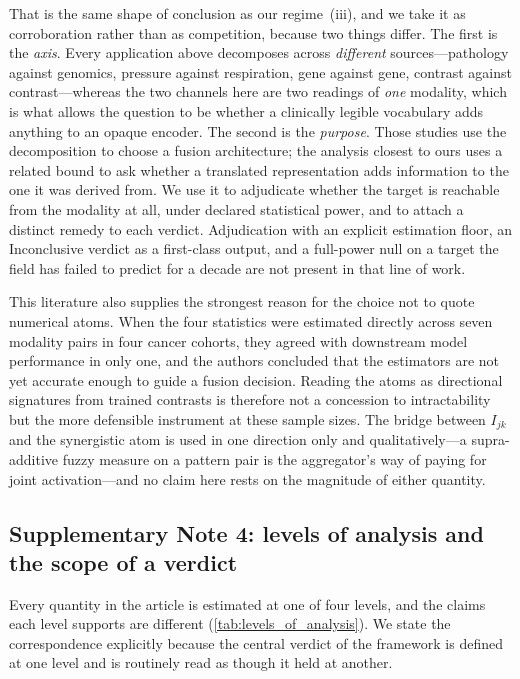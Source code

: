 That is the same shape of conclusion as our regime~(iii), and we take it
as corroboration rather than as competition, because two things differ.
The first is the \emph{axis}. Every application above decomposes across
\emph{different} sources---pathology against genomics, pressure against
respiration, gene against gene, contrast against contrast---whereas the
two channels here are two readings of \emph{one} modality, which is what
allows the question to be whether a clinically legible vocabulary adds
anything to an opaque encoder. The second is the \emph{purpose}. Those
studies use the decomposition to choose a fusion architecture; the
analysis closest to ours uses a related bound to ask whether a translated
representation adds information to the one it was derived
from.\cite{saisan2026ceilings} We use it to adjudicate whether the target
is reachable from the modality at all, under declared statistical power,
and to attach a distinct remedy to each verdict. Adjudication with an
explicit estimation floor, an Inconclusive verdict as a first-class
output, and a full-power null on a target the field has failed to
predict for a decade are not present in that line of work.

This literature also supplies the strongest reason for the choice not to
quote numerical atoms. When the four \pid{} statistics were estimated
directly across seven modality pairs in four cancer cohorts, they agreed
with downstream model performance in only one, and the authors concluded
that the estimators are not yet accurate enough to guide a fusion
decision.\cite{zhang2025evaluatingpid} Reading the atoms as directional
signatures from trained contrasts is therefore not a concession to
intractability but the more defensible instrument at these sample sizes.
The bridge between $I_{jk}$ and the synergistic atom is used in one
direction only and qualitatively---a supra-additive fuzzy measure on a
pattern pair is the aggregator's way of paying for joint activation---and
no claim here rests on the magnitude of either quantity.

\subsection*{Supplementary Note 4: levels of analysis and the scope of a verdict}

Every quantity in the article is estimated at one of four levels, and
the claims each level supports are different
(\cref{tab:levels_of_analysis}).
We state the correspondence explicitly because the central verdict of
the framework is defined at one level and is routinely read as though
it held at another.

